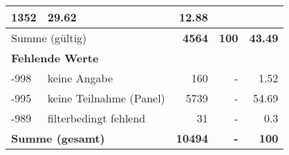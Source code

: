 \begin{longtable}{lXrrr}
       \num{1352} &
       \num[round-mode=places,round-precision=2]{29.62} &
         \num[round-mode=places,round-precision=2]{12.88} \\
     \midrule
     \multicolumn{2}{l}{Summe (gültig)} &
       \textbf{\num{4564}} &
     \textbf{\num{100}} &
       \textbf{\num[round-mode=places,round-precision=2]{43.49}} \\
     \multicolumn{5}{l}{\textbf{Fehlende Werte}}\\
       -998 &
       keine Angabe &
         \num{160} &
        - &
         \num[round-mode=places,round-precision=2]{1.52} \\
       -995 &
       keine Teilnahme (Panel) &
         \num{5739} &
        - &
         \num[round-mode=places,round-precision=2]{54.69} \\
       -989 &
       filterbedingt fehlend &
         \num{31} &
        - &
         \num[round-mode=places,round-precision=2]{0.3} \\
     \midrule
     \multicolumn{2}{l}{\textbf{Summe (gesamt)}} &
          \textbf{\num{10494}} &
        \textbf{-} &
        \textbf{\num{100}} \\
     \bottomrule
     \end{longtable}
     
